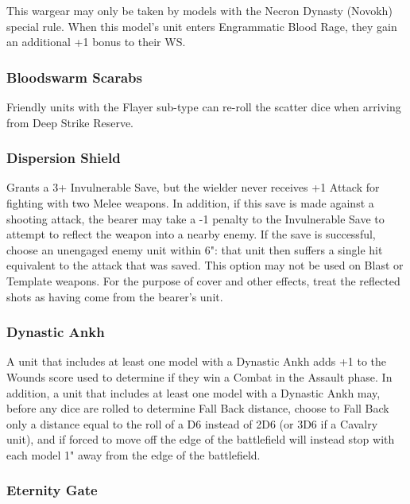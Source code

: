 This wargear may only be taken by models with the Necron Dynasty (Novokh) special rule. When this model's unit enters Engrammatic Blood Rage, they gain an additional +1 bonus to their WS.

\subsubsection{Bloodswarm Scarabs} \label{Bloodswarm Scarabs}

Friendly units with the Flayer sub-type can re-roll the scatter dice when arriving from Deep Strike Reserve. 

\subsubsection{Dispersion Shield} \label{Dispersion Shield}

Grants a 3+ Invulnerable Save, but the wielder never receives +1 Attack for fighting with two Melee weapons. In addition, if this save is made against a shooting attack, the bearer may take a -1 penalty to the Invulnerable Save to attempt to reflect the weapon into a nearby enemy. If the save is successful, choose an unengaged enemy unit within 6": that unit then suffers a single hit equivalent to the attack that was saved. This option may not be used on Blast or Template weapons. For the purpose of cover and other effects, treat the reflected shots as having come from the bearer's unit.

\subsubsection{Dynastic Ankh} \label{Dynastic Ankh}

A unit that includes at least one model with a Dynastic Ankh adds +1 to the Wounds score used to determine if they win a Combat in the Assault phase. In addition, a unit that includes at least one model with a Dynastic Ankh may, before any dice are rolled to determine Fall Back distance, choose to Fall Back only a distance equal to the roll of a D6 instead of 2D6 (or 3D6 if a Cavalry unit), and if forced to move off the edge of the battlefield will instead stop with each model 1" away from the edge of the battlefield.

\subsubsection{Eternity Gate} \label{Eternity Gate}

